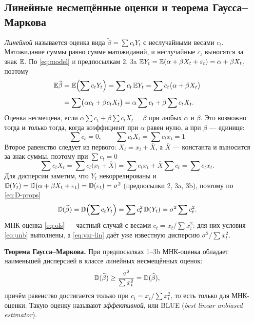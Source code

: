\subsection{Линейные несмещённые оценки и теорема Гаусса--Маркова}\label{sec:gm}

\emph{Линейной} называется оценка вида $\widetilde{\beta} = \sum c_tY_t$ с
неслучайными весами $c_t$. Матожидание суммы равно сумме матожиданий, и
неслучайные $c_t$ выносятся за знак $\mathbb{E}$. По \eqref{eq:model} и предпосылкам
2, 3a $\mathbb{E} Y_t = \mathbb{E}(\alpha + \beta X_t + \varepsilon_t) = \alpha + \beta X_t$,
поэтому
\[
\begin{aligned}
  \mathbb{E}\widetilde{\beta}
  &= \mathbb{E}\Bigl(\sum c_tY_t\Bigr) = \sum c_t\,\mathbb{E} Y_t
   = \sum c_t\bigl(\alpha + \beta X_t\bigr) \\[4pt]
  &= \sum\bigl(\alpha c_t + \beta c_tX_t\bigr)
   = \alpha\sum c_t + \beta\sum c_tX_t .
\end{aligned}
\]
Оценка несмещена, если $\alpha\sum c_t + \beta\sum c_tX_t = \beta$ при любых
$\alpha$ и $\beta$. Это возможно тогда и только тогда, когда коэффициент при
$\alpha$ равен нулю, а при $\beta$ — единице:
\begin{equation}
  \sum c_t = 0, \qquad \sum c_tX_t = \sum c_tx_t = 1
  \label{eq:unb}
\end{equation}
Второе равенство следует из первого: $X_t = x_t + \overline{X}$, а
$\overline{X}$ — константа и выносится за знак суммы, поэтому при
$\sum c_t = 0$
\[
  \sum c_tX_t = \sum c_t\bigl(x_t + \overline{X}\bigr)
  = \sum c_tx_t + \overline{X}\sum c_t
  = \sum c_tx_t .
\]
Для дисперсии заметим, что $Y_t$ некоррелированы и
$\mathbb{D}(Y_t) = \mathbb{D}(\alpha + \beta X_t + \varepsilon_t) = \mathbb{D}(\varepsilon_t) = \sigma^2$
(предпосылки 2, 3a, 3b), поэтому по \eqref{eq:D-props}
\begin{equation}
  \mathbb{D}(\widetilde{\beta}) = \mathbb{D}\Bigl(\sum c_tY_t\Bigr) = \sum c_t^2\,\mathbb{D}(Y_t)
  = \sigma^2\sum c_t^2 .
  \label{eq:var-lin}
\end{equation}
МНК-оценка \eqref{eq:ols} — частный случай с весами
$c_t = x_t\big/\sum x_t^2$: для них условия \eqref{eq:unb} выполнены, а
\eqref{eq:var-lin} даёт уже известную дисперсию $\sigma^2\big/\sum x_t^2$.

\textbf{Теорема Гаусса--Маркова.} При предпосылках 1--3b МНК-оценка обладает
наименьшей дисперсией в классе линейных несмещённых оценок:
\begin{equation}
  \mathbb{D}(\widetilde{\beta}) \ge \frac{\sigma^2}{\sum x_t^2} = \mathbb{D}(\widehat{\beta}),
  \label{eq:gm}
\end{equation}
причём равенство достигается только при $c_t = x_t\big/\sum x_t^2$, то есть
только для МНК-оценки. Такую оценку называют \emph{эффективной}, или BLUE
(\textit{best linear unbiased estimator}).

